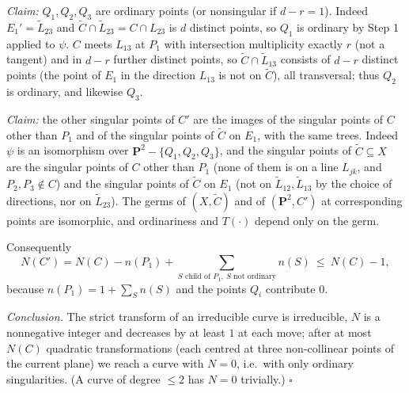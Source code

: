 \documentclass[11pt]{article}
\begin{document}
\emph{Claim:} $Q_1,Q_2,Q_3$ are ordinary points (or nonsingular if $d-r=1$). Indeed $E_1'=\widetilde L_{23}$ and $\widetilde C\cap\widetilde L_{23}=C\cap L_{23}$ is $d$ distinct points, so $Q_1$ is ordinary by Step 1 applied to $\psi$. $C$ meets $L_{13}$ at $P_1$ with intersection multiplicity exactly $r$ (not a tangent) and in $d-r$ further distinct points, so $\widetilde C\cap\widetilde L_{13}$ consists of $d-r$ distinct points (the point of $E_1$ in the direction $L_{13}$ is not on $\widetilde C$), all transversal; thus $Q_2$ is ordinary, and likewise $Q_3$.

\emph{Claim:} the other singular points of $C'$ are the images of the singular points of $C$ other than $P_1$ and of the singular points of $\widetilde C$ on $E_1$, with the same trees. Indeed $\psi$ is an isomorphism over $\mathbf P^2-\{Q_1,Q_2,Q_3\}$, and the singular points of $\widetilde C\subseteq X$ are the singular points of $C$ other than $P_1$ (none of them is on a line $L_{jk}$, and $P_2,P_3\notin C$) and the singular points of $\widetilde C$ on $E_1$ (not on $\widetilde L_{12},\widetilde L_{13}$ by the choice of directions, nor on $\widetilde L_{23}$). The germs of $(X,\widetilde C)$ and of $(\mathbf P^2,C')$ at corresponding points are isomorphic, and ordinariness and $T(\cdot)$ depend only on the germ.

Consequently
\[
N(C')=N(C)-n(P_1)+\sum_{S\text{ child of }P_1,\ S\text{ not ordinary}}n(S)\ \le\ N(C)-1,
\]
because $n(P_1)=1+\sum_Sn(S)$ and the points $Q_i$ contribute $0$.

\emph{Conclusion.} The strict transform of an irreducible curve is irreducible, $N$ is a nonnegative integer and decreases by at least $1$ at each move; after at most $N(C)$ quadratic transformations (each centred at three non-collinear points of the current plane) we reach a curve with $N=0$, i.e.\ with only ordinary singularities. (A curve of degree $\le 2$ has $N=0$ trivially.) \hfill$\square$
\end{document}
